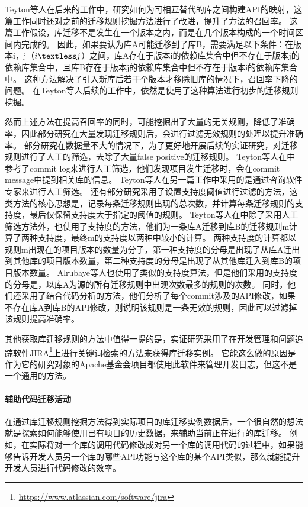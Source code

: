 \documentclass[UTF8]{ctexart}
\begin{document}
Teyton\cite{2013WCRE-Teyton-Automatic}等人在后来的工作中，研究如何为可相互替代的库之间构建API的映射，这篇工作同时还对之前的迁移规则挖掘方法进行了改进，提升了方法的召回率。
这篇工作假设，库迁移不是发生在一个版本之内，而是在几个版本构成的一个时间区间内完成的。
因此，如果要认为库A可能迁移到了库B，需要满足以下条件：在版本i，j（$i \textless j$）之间，库A存在于版本i的依赖库集合中但不存在于版本j的依赖库集合中，且库B存在于版本j的依赖库集合中但不存在于版本i的依赖库集合中。
这种方法解决了引入新库后若干个版本才移除旧库的情况下，召回率下降的问题。
在Teyton\cite{2014JournalOfSysAndSoft-Teyton-Study}等人后续的工作中，依然是使用了这种算法进行初步的迁移规则挖掘。

然而上述方法在提高召回率的同时，可能挖掘出了大量的无关规则，降低了准确率，因此部分研究在大量发现迁移规则后，会进行过滤无效规则的处理以提升准确率。
部分研究在数据量不大的情况下，为了更好地开展后续的实证研究，对迁移规则进行了人工的筛选，去除了大量false positive的迁移规则。
Teyton等人在\cite{2012WCRE-Teyton-Mining}中参考了commit log来进行人工筛选，他们发现项目发生迁移时，会在commit message中提到相关库的信息。
Teyton等人在另一篇工作中\cite{2014JournalOfSysAndSoft-Teyton-Study}采用的是通过咨询软件专家来进行人工筛选。
还有部分研究采用了设置支持度阈值进行过滤的方法，这类方法的核心思想是，记录每条迁移规则出现的总次数，并计算每条迁移规则的支持度，最后仅保留支持度大于指定的阈值的规则。
Teyton等人在\cite{2012WCRE-Teyton-Mining}中除了采用人工筛选方法外，也使用了支持度的方法，他们为一条库A迁移到库B的迁移规则m计算了两种支持度，最终m的支持度以两种中较小的计算。
两种支持度的计算都以规则m出现在的项目版本的数量为分子，第一种支持度的分母是出现了从库A迁出到其他库的项目版本数量，第二种支持度的分母是出现了从其他库迁入到库B的项目版本数量。
Alrubaye等人\cite{2019ICSME-Alrubaye-MigrationMiner}也使用了类似的支持度算法，但是他们采用的支持度的分母是，以库A为源的所有迁移规则中出现次数最多的规则的次数。
同时，他们还采用了结合代码分析的方法，他们分析了每个commit涉及的API修改，如果不存在库A到库B的API修改，则说明该规则是一条无效的规则，因此可以过滤掉该规则提高准确率。


其他获取库迁移规则的方法中值得一提的是，实证研究\cite{2016MSR-Kabinna-Logging}采用了在开发管理和问题追踪软件JIRA\footnote{\url{https://www.atlassian.com/software/jira}}上进行关键词检索的方法来获得库迁移实例。
它能这么做的原因是作为它的研究对象的Apache基金会项目都使用此软件来管理开发日志，但这不是一个通用的方法。


\paragraph{辅助代码迁移活动}
在通过库迁移规则挖掘方法得到实际项目的库迁移实例数据后，一个很自然的想法就是探索如何能够使用已有项目的历史数据，来辅助当前正在进行的库迁移。
例如，在实际将对一个库的调用代码修改成对另一个库的调用代码的过程中，如果能够告诉开发人员另一个库的哪些API功能与这个库的某个API类似，那么就能提升开发人员进行代码修改的效率。
\end{document}
